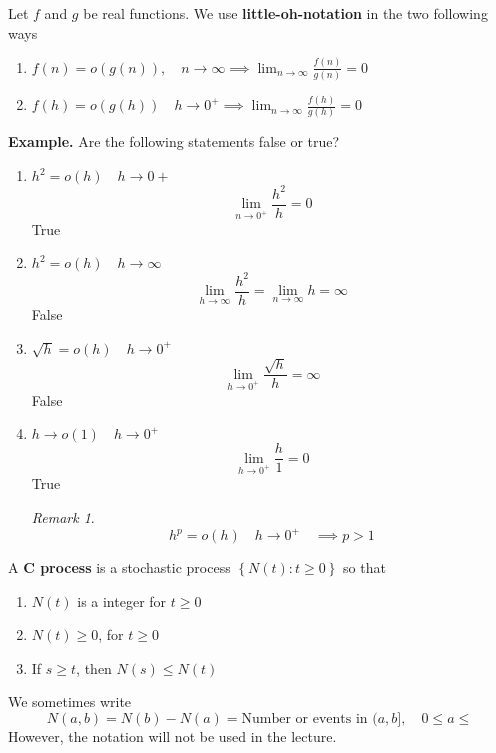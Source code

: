 \documentclass{article}
\theoremstyle{remark}
\newtheorem*{remark}{Remark}
\begin{document}
\begin{definition}
  Let $f$ and $g$ be real functions. We use \textbf{little-oh-notation}  in the two following ways
  \begin{enumerate}[label=(\roman*)]
    \item $\displaystyle f\left( n \right) = o\left( g\left( n \right) \right) , \quad  n\to \infty \implies  \lim_{n\to \infty} \frac{f\left( n \right)}{g\left( n \right) }  = 0 $
    \item $\displaystyle f\left( h \right) = o\left( g\left( h \right) \right) \quad h\to 0^{+} \implies  \lim_{ n\to \infty } \frac{f\left( h \right)}{ g\left( h \right)} = 0    $
  \end{enumerate}
\end{definition}

\begin{tcolorbox}
  \textbf{Example.} Are the following statements false or true?
  \begin{enumerate}[label=(\roman*)]
    \item $h^2 = o\left( h \right) \quad  h\to  0  + $ \[
    \lim_{n\to  0^{+}}  \frac{h^2}{h} = 0
    \]
    True
    \item $h^2 = o\left( h \right) \quad  h \to  \infty $ \[
        \lim_{h \to  \infty}  \frac{h^2}{h} = \lim_{n \to \infty} h = \infty
    \]
    False
    \item $\sqrt{h}  = o\left( h \right) \quad  h\to  0^{+} $ \[
    \lim_{h \to 0^{+}}  \frac{\sqrt{h} }{h}  = \infty
    \]
    False
    \item $h\to  o\left( 1 \right)\quad h\to 0^{+} $ \[
    \lim_{h \to 0^{+}}  \frac{h}{1 }  = 0
    \]
    True

    \begin{remark}
      \[
      h^{p} = o\left( h \right) \quad h \to 0^{+}\quad \implies p >1
      \]
    \end{remark}
  \end{enumerate}
\end{tcolorbox}

\newpage
\begin{definition}
  A \textbf{C process}  is a stochastic process $\left\{ N\left( t \right) : t \ge 0 \right\}$ so that
  \begin{enumerate}[label=(\roman*)]
    \item $N\left(  t \right)$ is a integer for $t\ge 0$
    \item $N\left( t \right) \ge 0$, for $t\ge0$
    \item If $s \ge t$, then $N\left( s \right) \le N\left( t \right)$
  \end{enumerate}
  We sometimes write \[
    N\left( a,b \right) = N\left( b \right) - N\left( a \right) = \text{Number or events in } (a,b] , \quad   0\le a \le
  \]
  However, the notation will not be used in the lecture.
\end{definition}
\end{document}
